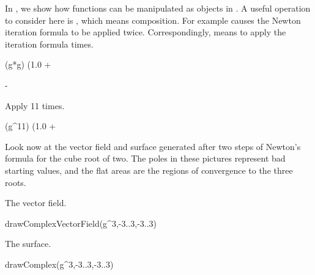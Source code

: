 In , we show how functions can be
manipulated as objects in \Language{}.
A useful operation to consider here is \spadop{*}, which means
composition.
For example  causes the Newton iteration formula
to be applied twice.
Correspondingly,  means to apply the iteration formula
 times.

%
\begin{xtc}
\begin{spadsrc}
(g*g) (1.0 + %
\end{spadsrc}
\begin{TeXOutput}
\begin{fricasmath}{24}
-{\TIMES \ImaginaryI }%
\end{fricasmath}
\end{TeXOutput}
\end{xtc}
\begin{xtc}
\begin{xtccomment}
Apply  11 times.
\end{xtccomment}
\begin{spadsrc}
(g^11) (1.0 + %
\end{spadsrc}
\begin{TeXOutput}
\begin{fricasmath}{25}
%
\end{fricasmath}
\end{TeXOutput}
\end{xtc}

Look now at the vector field and surface generated
after two steps of Newton's formula for the cube root of two.
The poles in these pictures represent bad starting values, and the
flat areas are the regions of convergence to the three roots.
%
\begin{psXtc}
\begin{xtccomment}
The vector field.
\end{xtccomment}
\begin{spadsrc}
drawComplexVectorField(g^3,-3..3,-3..3)
\end{spadsrc}
\end{psXtc}
\begin{psXtc}
\begin{xtccomment}
The surface.
\end{xtccomment}
\begin{spadsrc}
drawComplex(g^3,-3..3,-3..3)
\end{spadsrc}
\end{psXtc}
